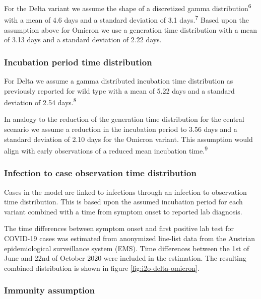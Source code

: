 \documentclass[
]{article}
\begin{document}
For the Delta variant we assume the shape of a discretized gamma distribution\textsuperscript{6}
with a mean of 4.6 days and a standard deviation of 3.1 days.\textsuperscript{7}
Based upon the assumption above for Omicron we use a generation time distribution with a mean of
3.13 days and a standard deviation of 2.22 days.

\hypertarget{methods-incubation}{%
\subsubsection{Incubation period time distribution}\label{methods-incubation}}

For Delta we assume a gamma distributed incubation time distribution as previously reported for
wild type with a mean of 5.22 days and a standard deviation of 2.54 days.\textsuperscript{8}

In analogy to the reduction of the generation time distribution for the central scenario
we assume a reduction in the incubation period to 3.56 days and a standard deviation of 2.10 days
for the Omicron variant. This assumption would align with early observations of a reduced
mean incubation time.\textsuperscript{9}

\hypertarget{infection-to-case-observation-time-distribution}{%
\subsubsection{Infection to case observation time distribution}\label{infection-to-case-observation-time-distribution}}

Cases in the model are linked to infections through an infection to observation time
distribution. This is based upon the assumed incubation period for each variant
combined with a time from symptom onset to reported lab diagnosis.

The time differences between symptom onset and first positive lab test for COVID-19 cases was estimated
from anonymized line-list data from the Austrian epidemiological surveillance system (EMS).
Time differences between the 1st of June and 22nd of October 2020 were included in the estimation.
The resulting combined distribution is shown in figure \ref{fig:i2o-delta-omicron}.

\hypertarget{immunity-assumption}{%
\subsubsection{Immunity assumption}\label{immunity-assumption}}
\end{document}
